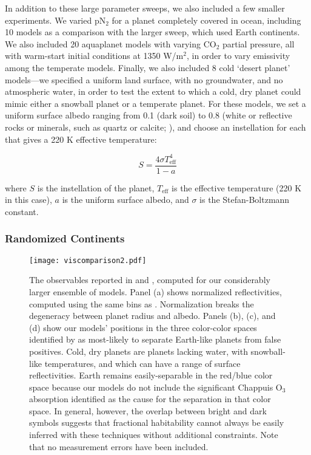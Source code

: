 \documentclass[fleqn,usenatbib]{mnras}
\begin{document}
In addition to these large parameter sweeps, we also included a few smaller experiments. We varied pN$_2$ for a planet completely covered in ocean, including 10 models as a comparison with the larger sweep, which used Earth continents. We also included 20 aquaplanet models with varying CO$_2$ partial pressure, all with warm-start initial conditions at 1350 W/m$^2$, in order to vary emissivity among the temperate models. Finally, we also included 8 cold `desert planet' models---we specified a uniform land surface, with no groundwater, and no atmospheric water, in order to test the extent to which a cold, dry planet could mimic either a snowball planet or a temperate planet. For these models, we set a uniform surface albedo ranging from 0.1 (dark soil) to 0.8 (white or reflective rocks or minerals, such as quartz or calcite; \citet{aster,ecostress}), and choose an instellation for each that gives a 220 K effective temperature:
\begin{linenomath*}
\begin{equation}
S = \frac{4\sigma T_\text{eff}^4}{1-a}
\end{equation}
\end{linenomath*}
where $S$ is the instellation of the planet, $T_\text{eff}$ is the effective temperature (220 K in this case), $a$ is the uniform surface albedo, and $\sigma$ is the Stefan-Boltzmann constant. 

\subsubsection{Randomized Continents}\label{obsec:land}
\begin{figure*}
\begin{center}
\texttt{[image: viscomparison2.pdf]}
\end{center}
\caption{The observables reported in \citet{Cowan2011} and \citet[][``KT16"]{Krissansen-Totton2016}, computed for our considerably larger ensemble of models. Panel (a) shows normalized reflectivities, computed using the same bins as \citet{Cowan2011}. Normalization breaks the degeneracy between planet radius and albedo. Panels (b), (c), and (d) show our models' positions in the three color-color spaces identified by \citet{Krissansen-Totton2016} as most-likely to separate Earth-like planets from false positives. Cold, dry planets are planets lacking water, with snowball-like temperatures, and which can have a range of surface reflectivities. Earth remains easily-separable in the red/blue color space because our models do not include the significant Chappuis O$_3$ absorption \citet{Krissansen-Totton2016} identified as the cause for the separation in that color space. In general, however, the overlap between bright and dark symbols suggests that fractional habitability cannot always be easily inferred with these techniques without additional constraints. Note that no measurement errors have been included.}\label{obfig:viscompar}
\end{figure*}
\end{document}
